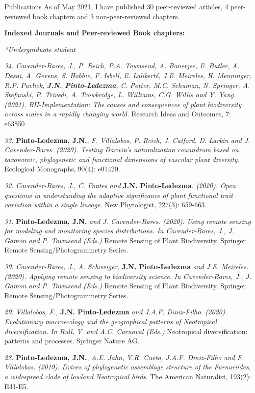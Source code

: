 \documentclass{resume} %
\begin{document}
\begin{rSection}{Publications}
As of May 2021, I have published 30 peer-reviewed articles, 4 peer-reviewed book chapters and 3 non-peer-reviewed chapters.

\textbf{Indexed Journals and Peer-reviewed Book chapters:}

\em{*Undergraduate student}

{\em 34.} {\em Cavender-Bares, J., P. Reich, P.A. Townsend, A. Banerjee, E. Butler, A. Desai, A. Gevens, S. Hobbie, F. Isbell, E. Laliberté, J.E. Meireles, H. Menninger, R.P. Pavlick, {\bf{J.N. Pinto-Ledezma}}, C. Potter, M.C. Schuman, N. Springer, A. Stefanski, P. Trivedi, A. Trowbridge, L. Williams, C.G. Willis and Y. Yang. (2021). BII-Implementation: The causes and consequences of plant biodiversity across scales in a rapidly changing world.} {Research Ideas and Outcomes, 7: e63850}. 

{\em 33.} {\bf{Pinto-Ledezma, J.N.}}, {\em F. Villalobos, P. Reich, J. Catford, D. Larkin and J. Cavender-Bares. (2020). Testing Darwin's naturalization conundrum based on taxonomic, phylogenetic and functional dimensions of vascular plant diversity.} {Ecological Monographs, 90(4): e01420}. 

{\em 32.} {\em Cavender-Bares, J., C. Fontes and} {\bf{J.N. Pinto-Ledezma}}. {\em (2020). Open questions in understanding the adaptive significance of plant functional trait variation within a single lineage.} {New Phytologist, 227(3): 659-663}. 

{\em 31.} {\bf{Pinto-Ledezma, J.N.}} {\em and J. Cavender-Bares. (2020). Using remote sensing for modeling and monitoring species distributions. In Cavender-Bares, J., J. Gamon and P. Townsend (Eds.)} {Remote Sensing of Plant Biodiversity. Springer Remote Sensing/Photogrammetry Series}.

{\em 30.} {\em Cavender-Bares, J., A. Schweiger,} {\bf{J.N. Pinto-Ledezma}} {\em and J.E. Meireles. (2020). Applying remote sensing to biodiversity science. In Cavender-Bares, J., J. Gamon and P. Townsend (Eds.)} {Remote Sensing of Plant Biodiversity. Springer Remote Sensing/Photogrammetry Series}. 

{\em 29.} {\em Villalobos, F.,} {\bf{J.N. Pinto-Ledezma}} {\em and J.A.F. Diniz-Filho. (2020). Evolutionary macroecology and the geographical patterns of Neotropical diversification. In Rull, V. and A.C. Carnaval (Eds.)} {Neotropical diversification: patterns and processes. Springer Nature AG}. 

{\em 28.} {\bf{Pinto-Ledezma, J.N.}}, {\em A.E. Jahn, V.R. Cueto, J.A.F. Diniz-Filho and F. Villalobos. (2019). Drives of phylogenetic assemblage structure of the Furnariides, a widespread clade of lowland Neotropical birds.} {The American Naturalist, 193(2): E41-E5}. 


\end{rSection}
\end{document}
